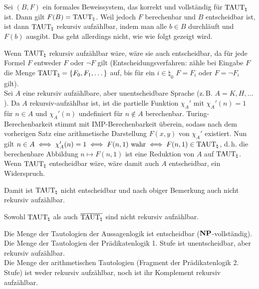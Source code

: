 \begin{Beweis}
    Sei $(B, F)$ ein formales Beweissystem, das korrekt und vollständig für $\text{TAUT}_\natural$ ist.
    Dann gilt $F(B) = \text{TAUT}_\natural$.
    Weil jedoch $F$ berechenbar und $B$ entscheidbar ist,
    ist dann $\text{TAUT}_\natural$ rekursiv aufzählbar, indem man alle $b \in B$ durchläuft und
    $F(b)$ ausgibt.
    Das geht allerdings nicht, wie wie folgt gezeigt wird.

    Wenn $\text{TAUT}_\natural$ rekursiv aufzählbar wäre, wäre sie auch entscheidbar,
    da für jede Formel $F$ entweder $F$ oder $\lnot F$ gilt
    (Entscheidungsverfahren: zähle bei Eingabe $F$ die Menge
    $\text{TAUT}_\natural = \{F_0, F_1, \dotsc\}$ auf, bis für ein $i \in \natural_0$
    $F = F_i$ oder $F = \lnot F_i$ gilt).\\
    Sei $A$ eine rekursiv aufzählbare, aber unentscheidbare Sprache (z.\,B. $A = K, H, \dotsc$).
    Da $A$ rekursiv-aufzählbar ist, ist die partielle Funktion $\chi_A'$ mit
    $\chi_A'(n) = 1$ für $n \in A$ und $\chi_A'(n)$ undefiniert für $n \notin A$ berechenbar.
    Turing-Berechenbarkeit stimmt mit IMP-Berechenbarkeit überein, sodass nach dem
    vorherigen Satz eine arithmetische Darstellung $F(x, y)$ von $\chi_A'$ existiert.
    Nun gilt $n \in A \iff \chi_A'(n) = 1 \iff F(n, 1) \text{ wahr} \iff
    F(n, 1) \in \text{TAUT}_\natural$, d.\,h. die berechenbare Abbildung $n \mapsto F(n, 1)$
    ist eine Reduktion von $A$ auf $\text{TAUT}_\natural$.
    Wenn $\text{TAUT}_\natural$ entscheidbar wäre, wäre damit auch $A$ entscheidbar, ein Widerspruch.

    Damit ist $\text{TAUT}_\natural$ nicht entscheidbar und nach obiger Bemerkung auch nicht rekursiv
    aufzählbar.
\end{Beweis}

\linie

\begin{Kor}
    Sowohl $\text{TAUT}_\natural$ als auch $\overline{\text{TAUT}_\natural}$ sind nicht rekursiv aufzählbar.
\end{Kor}

\begin{Bem}
    Die Menge der Tautologien der Aussagenlogik ist entscheidbar ($\mathbf{NP}$-vollständig).\\
    Die Menge der Tautologien der Prädikatenlogik 1. Stufe ist unentscheidbar, aber
    rekursiv aufzählbar.\\
    Die Menge der arithmetischen Tautologien (Fragment der Prädikatenlogik 2. Stufe)
    ist weder rekursiv aufzählbar, noch ist ihr Komplement rekursiv aufzählbar.
\end{Bem}

\pagebreak
